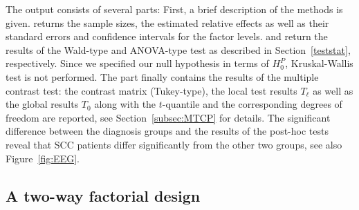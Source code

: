 The output consists of several parts: First, a brief description of the methods 
is given.  returns the sample sizes, the estimated relative 
effects as well as their standard errors and confidence intervals for the 
factor levels.  and  
return the results of the Wald-type and ANOVA-type test as described in 
Section~\ref{teststat}, respectively. Since we specified our null hypothesis in 
terms of $H_0^P$, Kruskal-Wallis test is not performed. The part  
finally contains the results of the multiple contrast test: the contrast matrix 
(Tukey-type), the local test results $T_\ell$ as well as the global results 
$T_0$ along with the $t$-quantile and the corresponding degrees of freedom 
\citep{konietschke2012rank} are reported, see Section~\ref{subsec:MTCP} for 
details. The significant difference between the diagnosis groups and the results of the post-hoc tests reveal that SCC patients differ significantly from the other two 
groups, see also Figure~\ref{fig:EEG}.


\subsection{A two-way factorial design} 

